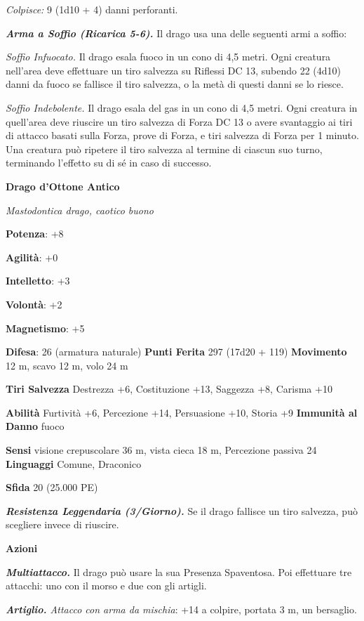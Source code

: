 \begin{multicols}{2}
\emph{Colpisce:} 9 (1d10 + 4) danni perforanti.

\emph{\textbf{Arma a Soffio (Ricarica 5-6).}} Il drago usa una delle
seguenti armi a soffio:

\emph{Soffio Infuocato.} Il drago esala fuoco in un cono di 4,5 metri.
Ogni creatura nell'area deve effettuare un tiro salvezza su Riflessi DC
13, subendo 22 (4d10) danni da fuoco se fallisce il tiro salvezza, o la
metà di questi danni se lo riesce.

\emph{Soffio Indebolente.} Il drago esala del gas in un cono di 4,5
metri. Ogni creatura in quell'area deve riuscire un tiro salvezza di Forza DC 13 o avere svantaggio ai tiri di attacco basati sulla Forza,
prove di Forza, e tiri salvezza di Forza per 1 minuto. Una creatura può
ripetere il tiro salvezza al termine di ciascun suo turno, terminando
l'effetto su di sé in caso di successo.



\textbf{Drago d'Ottone Antico}

\emph{Mastodontica drago, caotico buono}

\textbf{Potenza}: +8

\textbf{Agilità}: +0

\textbf{Intelletto}: +3

\textbf{Volontà}: +2

\textbf{Magnetismo}: +5

\textbf{Difesa}: 26 (armatura naturale) \textbf{Punti Ferita}
297 (17d20 + 119) \textbf{Movimento} 12 m, scavo 12 m, volo 24 m

\textbf{Tiri Salvezza} Destrezza +6, Costituzione +13, Saggezza +8,
Carisma +10

\textbf{Abilità} Furtività +6, Percezione +14, Persuasione +10, Storia
+9 \textbf{Immunità al Danno} fuoco

\textbf{Sensi} visione crepuscolare 36 m, vista cieca 18 m, Percezione passiva
24 \textbf{Linguaggi} Comune, Draconico

\textbf{Sfida} 20 (25.000 PE)

\emph{\textbf{Resistenza Leggendaria (3/Giorno).}} Se il drago fallisce
un tiro salvezza, può scegliere invece di riuscire.

\textbf{Azioni}

\emph{\textbf{Multiattacco.}} Il drago può usare la sua Presenza
Spaventosa. Poi effettuare tre attacchi: uno con il morso e due con gli
artigli.

\emph{\textbf{Artiglio.} Attacco con arma da mischia}: +14 a colpire,
portata 3 m, un bersaglio.


\end{multicols}
